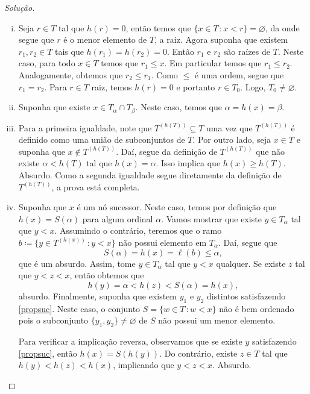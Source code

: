 \documentclass[a4paper]{article}
\begin{document}
\begin{proof}[Solução]\hfill
  \begin{enumerate}[(i)]

  \item Seja \(r\in T\) tal que \(h(r)=0\), então temos que \(\{x\in T\,\colon
    x<r\}=\varnothing\), da onde segue que \(r\) é o menor elemento de \(T\), a raiz.
    Agora suponha que existem \(r_1, r_2\in T\) tais que \(h(r_1)=h(r_2)=0\). Então \(r_1\) e
    \(r_2\) são raízes de \(T\). Neste caso,  para todo \(x\in T\) temos que
    \(r_1\leq x\). Em particular temos que \(r_1\leq r_2\).
    Analogamente, obtemos que \(r_2\leq r_1\). Como \(\leq\) é
    uma ordem, segue que \(r_1=r_2\). Para \(r\in T\) raiz, temos \(h(r)=0\) e portanto
    \(r\in T_0\). Logo, \(T_0\not=\varnothing\).
    
  \item Suponha que existe \(x\in T_\alpha\cap T_\beta\). Neste caso, temos que
    \(\alpha=h(x)=\beta\).

  \item Para a primeira igualdade, note que \(T^{(h(T))}\subseteq T\) uma vez
    que \(T^{(h(T))}\) é definido como uma união de subconjuntos de \(T\). Por
    outro lado, seja \(x\in T\) e suponha que \(x\not\in T^{(h(T))}\). Daí,
    segue da definição de \(T^{(h(T))}\) que não existe \(\alpha < h(T)\) tal
    que \(h(x)=\alpha\). Isso implica
    que \(h(x)\geq h(T)\). Absurdo. Como a segunda igualdade segue diretamente da
    definição de \(T^{(h(T))}\), a prova está completa. 

  \item Suponha que \(x\) é um nó sucessor. Neste caso, temos por definição
    que \(h(x)=S(\alpha)\) para algum ordinal \(\alpha\). Vamos mostrar que
    existe \(y\in T_\alpha\) tal que \(y < x\). Assumindo o contrário, teremos
    que o ramo \(b\coloneqq\{y\in T^{(h(x))}\,\colon y<x\}\) não possui elemento em
    \(T_\alpha\). Daí, segue que \[S(\alpha)=h(x)=\ell(b)\leq\alpha,\] que é um absurdo. 
    Assim, tome \(y\in T_\alpha\) tal que \(y<x\) qualquer. Se
    existe \(z\) tal que \(y<z<x\), então obtemos
    que \[h(y)=\alpha<h(z)<S(\alpha)=h(x),\] 
    absurdo. Finalmente, suponha que existem \(y_1\) e \(y_2\) distintos satisfazendo
    \eqref{propsuc}. Neste caso, o conjunto \(S=\{w\in
    T\,\colon w <x\}\) não é bem ordenado pois o subconjunto
    \(\{y_1,y_2\}\not = \varnothing\) de \(S\) não possui um menor elemento.

    Para verificar a implicação reversa, observamos que se existe \(y\) satisfazendo
    \eqref{propsuc}, então \(h(x)=S(h(y))\). Do contrário, existe \(z\in T\) tal
    que \(h(y)<h(z)<h(x)\), implicando que \(y<z<x\). Absurdo.


\end{enumerate}
\end{proof}
\end{document}
